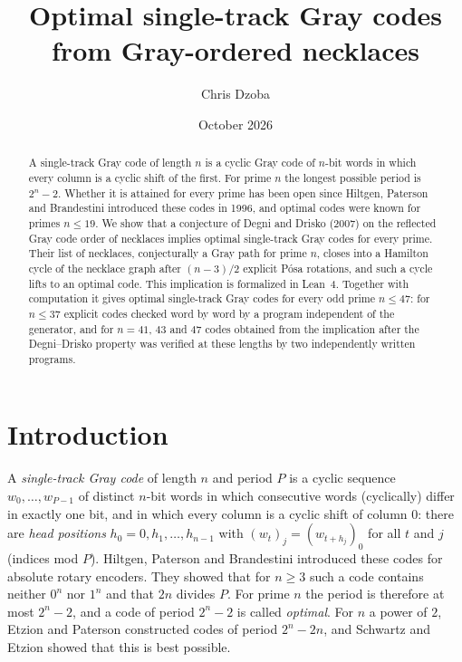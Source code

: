 \documentclass[11pt]{article}
\title{Optimal single-track Gray codes from Gray-ordered necklaces}
\author{Chris Dzoba}
\date{October 2026}
\begin{document}
\maketitle

\begin{abstract}
A single-track Gray code of length $n$ is a cyclic Gray code of $n$-bit words in which every column is a cyclic shift
of the first. For prime $n$ the longest possible period is $2^n-2$. Whether it is attained for every prime has been open
since Hiltgen, Paterson and Brandestini introduced these codes in 1996, and optimal codes were known for primes
$n\le 19$. We show that a conjecture of Degni and Drisko (2007) on the reflected Gray code order of necklaces implies
optimal single-track Gray codes for every prime. Their list of necklaces, conjecturally a Gray path for prime $n$, closes
into a Hamilton cycle of the necklace graph after $(n-3)/2$ explicit P\'osa rotations, and such a cycle lifts to an
optimal code. This implication is formalized in Lean~4. Together with computation it gives optimal single-track Gray
codes for every odd prime $n\le 47$: for $n\le 37$ explicit codes checked word by word by a program independent of the
generator, and
for $n=41$, $43$ and $47$ codes obtained from the implication after the Degni--Drisko property was verified at these
lengths by two independently written programs.
\end{abstract}

\section{Introduction}

A \emph{single-track Gray code} of length $n$ and period $P$ is a cyclic sequence $w_0,\dots,w_{P-1}$ of distinct
$n$-bit words in which consecutive words (cyclically) differ in exactly one bit, and in which every column is a cyclic
shift of column $0$: there are \emph{head positions} $h_0=0,h_1,\dots,h_{n-1}$ with $(w_t)_j=(w_{t+h_j})_0$ for all
$t$ and $j$ (indices mod $P$). Hiltgen, Paterson and Brandestini \cite{HPB96} introduced these codes for absolute
rotary encoders. They showed that for $n\ge 3$ such a code contains neither $0^n$ nor $1^n$ and that $2n$ divides $P$.
For prime $n$ the period is therefore at most $2^n-2$, and a code of period $2^n-2$ is called \emph{optimal}. For $n$ a
power of $2$, Etzion and Paterson \cite{EP96} constructed codes of period $2^n-2n$, and Schwartz and Etzion
\cite{SE99} showed that this is best possible.
\end{document}
